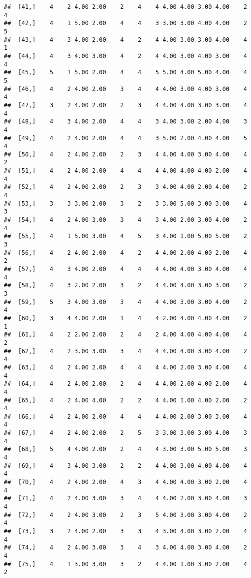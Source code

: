 \documentclass[]{article}
\begin{document}
\begin{verbatim}
##  [41,]    4    2 4.00 2.00    2    4    4 4.00 4.00 3.00 4.00    2    4
##  [42,]    4    1 5.00 2.00    4    4    3 3.00 3.00 4.00 4.00    2    5
##  [43,]    4    3 4.00 2.00    4    2    4 4.00 3.00 3.00 4.00    4    1
##  [44,]    4    3 4.00 3.00    4    2    4 4.00 3.00 4.00 3.00    4    4
##  [45,]    5    1 5.00 2.00    4    4    5 5.00 4.00 5.00 4.00    4    5
##  [46,]    4    2 4.00 2.00    3    4    4 4.00 3.00 4.00 3.00    4    4
##  [47,]    3    2 4.00 2.00    2    3    4 4.00 4.00 3.00 3.00    4    4
##  [48,]    4    3 4.00 2.00    4    4    3 4.00 3.00 2.00 4.00    3    4
##  [49,]    4    2 4.00 2.00    4    4    3 5.00 2.00 4.00 4.00    5    4
##  [50,]    4    2 4.00 2.00    2    3    4 4.00 4.00 3.00 4.00    4    2
##  [51,]    4    2 4.00 2.00    4    4    4 4.00 4.00 4.00 2.00    4    4
##  [52,]    4    2 4.00 2.00    2    3    3 4.00 4.00 2.00 4.00    2    4
##  [53,]    3    3 3.00 2.00    3    2    3 3.00 5.00 3.00 3.00    4    3
##  [54,]    4    2 4.00 3.00    3    4    3 4.00 2.00 3.00 4.00    2    4
##  [55,]    4    1 5.00 3.00    4    5    3 4.00 1.00 5.00 5.00    2    3
##  [56,]    4    2 4.00 2.00    4    2    4 4.00 2.00 4.00 2.00    4    2
##  [57,]    4    3 4.00 2.00    4    4    4 4.00 4.00 3.00 4.00    4    4
##  [58,]    4    3 2.00 2.00    3    2    4 4.00 4.00 3.00 3.00    2    3
##  [59,]    5    3 4.00 3.00    3    4    4 4.00 3.00 3.00 4.00    2    4
##  [60,]    3    4 4.00 2.00    1    4    4 2.00 4.00 4.00 4.00    2    1
##  [61,]    4    2 2.00 2.00    2    4    2 4.00 4.00 4.00 4.00    4    2
##  [62,]    4    2 3.00 3.00    3    4    4 4.00 4.00 3.00 4.00    2    4
##  [63,]    4    2 4.00 2.00    4    4    4 4.00 2.00 3.00 4.00    4    4
##  [64,]    4    2 4.00 2.00    2    4    4 4.00 2.00 4.00 2.00    4    4
##  [65,]    4    2 4.00 4.00    2    2    4 4.00 1.00 4.00 2.00    2    4
##  [66,]    4    2 4.00 2.00    4    4    4 4.00 2.00 3.00 3.00    4    4
##  [67,]    4    2 4.00 2.00    2    5    3 3.00 3.00 3.00 4.00    3    4
##  [68,]    5    4 4.00 2.00    2    4    4 3.00 3.00 5.00 5.00    3    4
##  [69,]    4    3 4.00 3.00    2    2    4 4.00 3.00 4.00 4.00    4    4
##  [70,]    4    2 4.00 2.00    4    3    4 4.00 4.00 3.00 2.00    4    4
##  [71,]    4    2 4.00 3.00    3    4    4 4.00 2.00 3.00 4.00    3    4
##  [72,]    4    2 4.00 3.00    2    3    5 4.00 3.00 3.00 4.00    2    4
##  [73,]    3    2 4.00 2.00    3    3    4 3.00 4.00 3.00 2.00    4    4
##  [74,]    4    2 4.00 3.00    3    4    3 4.00 4.00 3.00 4.00    2    4
##  [75,]    4    1 3.00 3.00    3    2    4 4.00 1.00 3.00 2.00    4    2

\end{verbatim}
\end{document}
